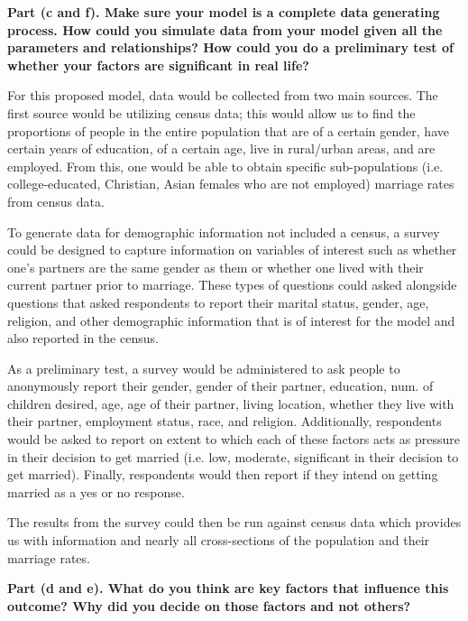 \documentclass[letterpaper,12pt]{article}
\theoremstyle{definition}
\begin{document}
\vspace{2mm}

\noindent\textbf{Part (c and f). Make sure your model is a complete data generating process. How could you simulate data from your model given all the parameters and relationships? How could you do a preliminary test of whether your factors are significant in real life?}

For this proposed model, data would be collected from two main sources. The first source would be utilizing census data; this would allow us to find the proportions of people in the entire population that are of a certain gender, have certain years of education, of a certain age, live in rural/urban areas, and are employed. From this, one would be able to obtain specific sub-populations (i.e. college-educated, Christian, Asian females who are not employed) marriage rates from census data. 

To generate data for demographic information not included a census, a survey could be designed to capture information on variables of interest such as whether one's partners are the same gender as them or whether one lived with their current partner prior to marriage. These types of questions could asked alongside questions that asked respondents to report their marital status, gender, age, religion, and other demographic information that is of interest for the model and also reported in the census. 

As a preliminary test, a survey would be administered to ask  people to anonymously report their gender, gender of their partner, education, num. of children desired, age, age of their partner, living location, whether they live with their partner, employment status, race, and religion. Additionally, respondents would be asked to report on extent to which each of these factors acts as pressure in their decision to get married (i.e. low, moderate, significant in their decision to get married). Finally, respondents would then report if they intend on getting married as a yes or no response. 

The results from the survey could then be run against census data which provides us with information and nearly all cross-sections of the population and their marriage rates. 

\vspace{2mm}

\noindent\textbf{Part (d and e). What do you think are key factors that influence this outcome? Why did you decide on those factors and not others?}
\end{document}

